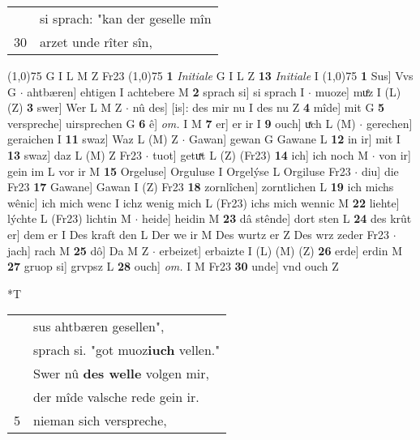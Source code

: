 \documentclass[8pt,a4paper,notitlepage]{article}
\begin{document}
\begin{table}[ht]
\begin{minipage}[t]{0.5\linewidth}
\begin{tabular}{rl}
 & si sprach: "kan der geselle mîn\\ 
30 & arzet unde rîter sîn,\\ 
\end{tabular}
\scriptsize
\line(1,0){75} \newline
G I L M Z Fr23 \newline
\line(1,0){75} \newline
\textbf{1} \textit{Initiale} G I L Z  \textbf{13} \textit{Initiale} I  \newline
\line(1,0){75} \newline
\textbf{1} Sus] Vvs G  $\cdot$ ahtbæren] ehtigen I achtebere M \textbf{2} sprach si] si sprach I  $\cdot$ muoze] muͤz I (L) (Z) \textbf{3} swer] Wer L M Z  $\cdot$ nû des] [is]: des mir nu I des nu Z \textbf{4} mîde] mit G \textbf{5} verspreche] uirsprechen G \textbf{6} ê] \textit{om.} I M \textbf{7} er] er ir I \textbf{9} ouch] uͯch L (M)  $\cdot$ gerechen] geraichen I \textbf{11} swaz] Waz L (M) Z  $\cdot$ Gawan] gewan G Gawane L \textbf{12} in ir] mit I \textbf{13} swaz] daz L (M) Z Fr23  $\cdot$ tuot] getuͯt L (Z) (Fr23) \textbf{14} ich] ich noch M  $\cdot$ von ir] gein im L vor ir M \textbf{15} Orgeluse] Orguluse I Orgelýse L Orgiluse Fr23  $\cdot$ diu] die Fr23 \textbf{17} Gawane] Gawan I (Z) Fr23 \textbf{18} zornlîchen] zorntlichen L \textbf{19} ich michs wênic] ich mich wenc I ichz wenig mich L (Fr23) ichs mich wennic M \textbf{22} liehte] lýchte L (Fr23) lichtin M  $\cdot$ heide] heidin M \textbf{23} dâ stênde] dort sten L \textbf{24} des krût er] dem er I Des kraft den L Der we ir M Des wurtz er Z Des wrz zeder Fr23  $\cdot$ jach] rach M \textbf{25} dô] Da M Z  $\cdot$ erbeizet] erbaizte I (L) (M) (Z) \textbf{26} erde] erdin M \textbf{27} gruop si] grvpsz L \textbf{28} ouch] \textit{om.} I M Fr23 \textbf{30} unde] vnd ouch Z \newline
\end{minipage}
\hspace{0.5cm}
\begin{minipage}[t]{0.5\linewidth}
\small
\begin{center}*T
\end{center}
\begin{tabular}{rl}
 & sus ahtbæren gesellen",\\ 
 & sprach si. "got muoz\textbf{iuch} vellen."\\ 
 & Swer nû \textbf{des welle} volgen mir,\\ 
 & der mîde valsche rede gein ir.\\ 
5 & nieman sich verspreche,\\ 

\end{tabular}
\end{minipage}
\end{table}
\end{document}
